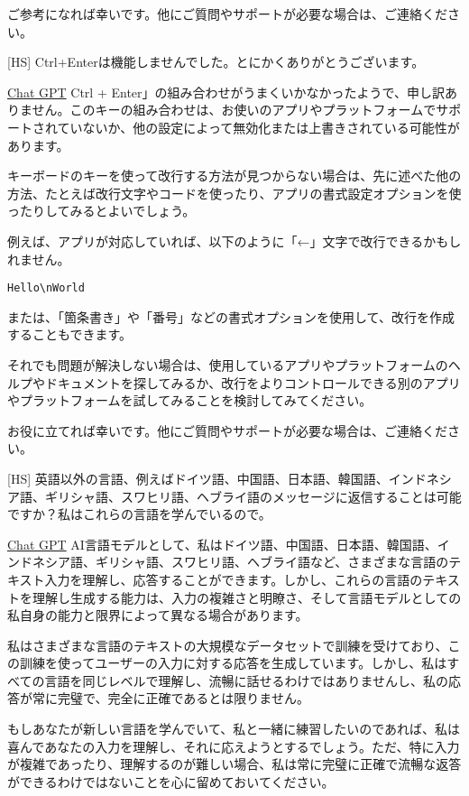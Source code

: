 \documentclass[
]{bxjsbook}
\theoremstyle{definition}
\theoremstyle{definition}
\theoremstyle{definition}
\theoremstyle{definition}
\theoremstyle{remark}
\begin{document}
ご参考になれば幸いです。他にご質問やサポートが必要な場合は、ご連絡ください。

{[}HS{]} Ctrl+Enterは機能しませんでした。とにかくありがとうございます。

\protect\hyperlink{chatgpt}{Chat GPT} Ctrl + Enter」の組み合わせがうまくいかなかったようで、申し訳ありません。このキーの組み合わせは、お使いのアプリやプラットフォームでサポートされていないか、他の設定によって無効化または上書きされている可能性があります。

キーボードのキーを使って改行する方法が見つからない場合は、先に述べた他の方法、たとえば改行文字やコードを使ったり、アプリの書式設定オプションを使ったりしてみるとよいでしょう。

例えば、アプリが対応していれば、以下のように「←」文字で改行できるかもしれません。

\begin{verbatim}
Hello\nWorld
\end{verbatim}

または、「箇条書き」や「番号」などの書式オプションを使用して、改行を作成することもできます。

それでも問題が解決しない場合は、使用しているアプリやプラットフォームのヘルプやドキュメントを探してみるか、改行をよりコントロールできる別のアプリやプラットフォームを試してみることを検討してみてください。

お役に立てれば幸いです。他にご質問やサポートが必要な場合は、ご連絡ください。

{[}HS{]} 英語以外の言語、例えばドイツ語、中国語、日本語、韓国語、インドネシア語、ギリシャ語、スワヒリ語、ヘブライ語のメッセージに返信することは可能ですか？私はこれらの言語を学んでいるので。

\protect\hyperlink{chatgpt}{Chat GPT} AI言語モデルとして、私はドイツ語、中国語、日本語、韓国語、インドネシア語、ギリシャ語、スワヒリ語、ヘブライ語など、さまざまな言語のテキスト入力を理解し、応答することができます。しかし、これらの言語のテキストを理解し生成する能力は、入力の複雑さと明瞭さ、そして言語モデルとしての私自身の能力と限界によって異なる場合があります。

私はさまざまな言語のテキストの大規模なデータセットで訓練を受けており、この訓練を使ってユーザーの入力に対する応答を生成しています。しかし、私はすべての言語を同じレベルで理解し、流暢に話せるわけではありませんし、私の応答が常に完璧で、完全に正確であるとは限りません。

もしあなたが新しい言語を学んでいて、私と一緒に練習したいのであれば、私は喜んであなたの入力を理解し、それに応えようとするでしょう。ただ、特に入力が複雑であったり、理解するのが難しい場合、私は常に完璧に正確で流暢な返答ができるわけではないことを心に留めておいてください。
\end{document}
